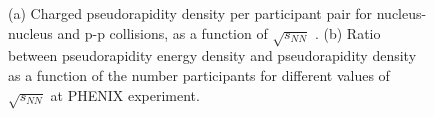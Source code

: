 \begin{figure}
  \centering
  \quad
  \caption{(a) Charged pseudorapidity density per participant pair for nucleus-nucleus and p-p collisions, as a function of $\sqrt{s_{NN}}$ \cite{multen}. (b) Ratio between pseudorapidity energy density and pseudorapidity density as a function of the number participants for different values of $\sqrt{s_{NN}}$ at PHENIX experiment.}
\end{figure}
